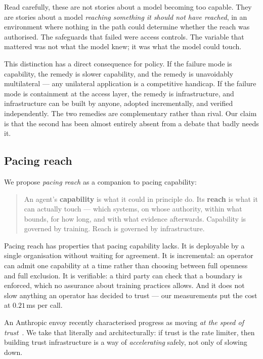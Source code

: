 \documentclass[11pt]{article}
\begin{document}
Read carefully, these are not stories about a model becoming too capable. They
are stories about a model \emph{reaching something it should not have reached},
in an environment where nothing in the path could determine whether the reach was
authorised. The safeguards that failed were access controls. The variable that
mattered was not what the model knew; it was what the model could touch.

This distinction has a direct consequence for policy. If the failure mode is
capability, the remedy is slower capability, and the remedy is unavoidably
multilateral --- any unilateral application is a competitive handicap. If the
failure mode is containment at the access layer, the remedy is infrastructure,
and infrastructure can be built by anyone, adopted incrementally, and verified
independently. The two remedies are complementary rather than rival. Our claim is
that the second has been almost entirely absent from a debate that badly needs
it.

\subsection{Pacing reach}

We propose \emph{pacing reach} as a companion to pacing capability:

\begin{quote}
An agent's \textbf{capability} is what it could in principle do. Its
\textbf{reach} is what it can actually touch --- which systems, on whose
authority, within what bounds, for how long, and with what evidence afterwards.
Capability is governed by training. Reach is governed by infrastructure.
\end{quote}

Pacing reach has properties that pacing capability lacks. It is deployable by a
single organisation without waiting for agreement. It is incremental: an operator
can admit one capability at a time rather than choosing between full openness and
full exclusion. It is verifiable: a third party can check that a boundary is
enforced, which no assurance about training practices allows. And it does not
slow anything an operator has decided to trust --- our measurements put the cost
at $0.21$\,ms per call.

An Anthropic envoy recently characterised progress as moving
\emph{at the speed of trust}~\cite{neuron2026}. We take that literally and
architecturally: if trust is the rate limiter, then building trust infrastructure
is a way of \emph{accelerating} safely, not only of slowing down.
\end{document}
